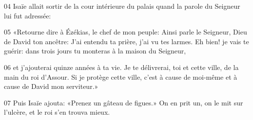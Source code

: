 
04 Isaïe allait sortir de la cour intérieure du palais quand la parole du Seigneur lui fut adressée:

05 «Retourne dire à Ézékias, le chef de mon peuple: Ainsi parle le Seigneur, Dieu de David ton ancêtre: J’ai entendu ta prière, j’ai vu tes larmes. Eh bien! je vais te guérir: dans trois jours tu monteras à la maison du Seigneur,

06 et j’ajouterai quinze années à ta vie. Je te délivrerai, toi et cette ville, de la main du roi d’Assour. Si je protège cette ville, c’est à cause de moi-même et à cause de David mon serviteur.»

07 Puis Isaïe ajouta: «Prenez un gâteau de figues.» On en prit un, on le mit sur l’ulcère, et le roi s’en trouva mieux.

